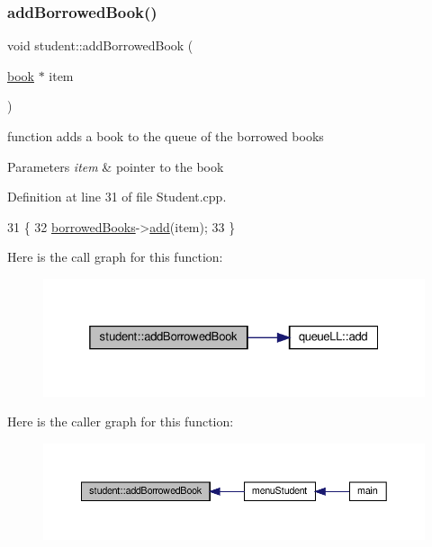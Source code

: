 \subsubsection{\texorpdfstring{add\+Borrowed\+Book()}{addBorrowedBook()}}
{\footnotesize\ttfamily void student\+::add\+Borrowed\+Book (\begin{DoxyParamCaption}\item[{\hyperlink{classbook}{book} $\ast$}]{item }\end{DoxyParamCaption})}

function adds a book to the queue of the borrowed books 
\begin{DoxyParams}{Parameters}
{\em item} & pointer to the book \\
\hline
\end{DoxyParams}


Definition at line 31 of file Student.\+cpp.


\begin{DoxyCode}
31                                         \{
32     \hyperlink{classstudent_ab477f6c1525709586ea41364dc8c568b}{borrowedBooks}->\hyperlink{classqueue_l_l_adcbcc26433da2c9d17b6cf0802d1d7d2}{add}(item);
33 \}
\end{DoxyCode}
Here is the call graph for this function\+:
\nopagebreak
\begin{figure}[H]
\begin{center}
\leavevmode
\includegraphics[width=325pt]{classstudent_af02c927727b890c189a4641f01185bcc_cgraph}
\end{center}
\end{figure}
Here is the caller graph for this function\+:
\nopagebreak
\begin{figure}[H]
\begin{center}
\leavevmode
\includegraphics[width=350pt]{classstudent_af02c927727b890c189a4641f01185bcc_icgraph}
\end{center}
\end{figure}
\mbox{\label{classstudent_a4bc363a59fc8b14d81e8e5e0d2326444}} 

